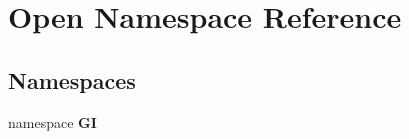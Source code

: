 \section{Open Namespace Reference}
\label{namespace_open}
\subsection*{Namespaces}
\begin{DoxyCompactItemize}
\item 
namespace \textbf{ GI}
\end{DoxyCompactItemize}
